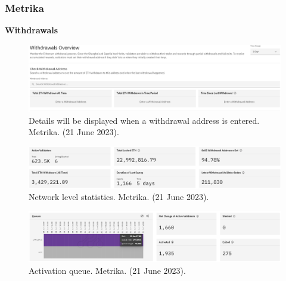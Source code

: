\documentclass[UTF8]{article}
\begin{document}
{\clearpage
\subsubsection*{Metrika}
\textbf{Withdrawals}
\begin{figure}[htbp]
\begin{center}
\includegraphics[width=0.9\linewidth]{images/metrika1}
\caption{Details will be displayed when a withdrawal address is entered. Metrika. (21 June 2023). }
\label{fig:metrika1}
\end{center}
\end{figure}

\begin{figure}[htbp]
\begin{center}
\includegraphics[width=0.9\linewidth]{images/metrika2}
\caption{Network level statistics. Metrika. (21 June 2023). }
\label{fig:metrika2}
\end{center}
\end{figure}

\begin{figure}[htbp]
\begin{center}
\includegraphics[width=0.9\linewidth]{images/metrika3}
\caption{Activation queue. Metrika. (21 June 2023). }
\label{fig:metrika3}
\end{center}
\end{figure}

}
\end{document}
